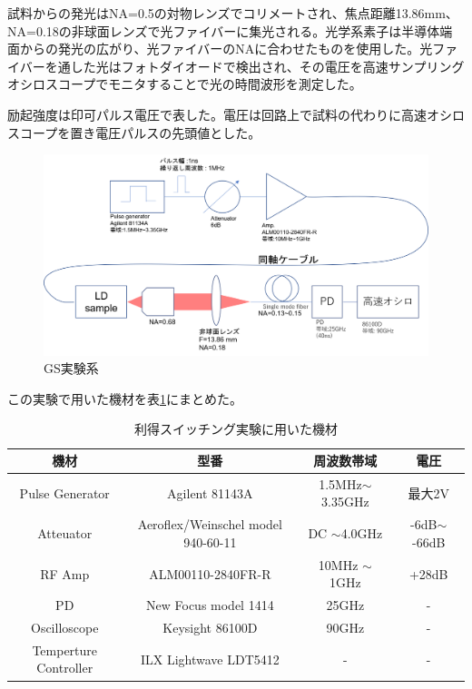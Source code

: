 試料からの発光はNA=0.5の対物レンズでコリメートされ、焦点距離13.86mm、NA=0.18の非球面レンズで光ファイバーに集光される。光学系素子は半導体端面からの発光の広がり、光ファイバーのNAに合わせたものを使用した。光ファイバーを通した光はフォトダイオードで検出され、その電圧を高速サンプリングオシロスコープでモニタすることで光の時間波形を測定した。

励起強度は印可パルス電圧で表した。電圧は回路上で試料の代わりに高速オシロスコープを置き電圧パルスの先頭値とした。
\begin{figure}[h]
	\includegraphics[width=15cm]{figure/fig_2_3_GS_setup.png}
	\caption{GS実験系}
	\label{fig:fig_2_3_GS_setup}
\end{figure}


この実験で用いた機材を表\ref{table:table_2_2_GS_setup}にまとめた。
\begin{table}[h]
  \caption{利得スイッチング実験に用いた機材}
  \label{table:table_2_2_GS_setup}
  \centering
  \begin{tabular}{cccc}
    \hline
    機材  & 型番   & 周波数帯域 &電圧 \\
    \hline \hline
    Pulse Generator  & Agilent 81143A & 1.5MHz$\sim$ 3.35GHz  &最大2V \\
    Atteuator  &  Aeroflex/Weinschel model 940-60-11    & DC $\sim$4.0GHz& -6dB$\sim$ -66dB\\
    RF Amp & ALM00110-2840FR-R & 10MHz $\sim$ 1GHz & +28dB\\
    PD & New Focus model 1414 & 25GHz &-\\
    Oscilloscope  &  Keysight 86100D & 90GHz  &-\\
     Temperture Controller & ILX Lightwave  LDT5412&-&-\\
       \hline
  \end{tabular}
\end{table}
